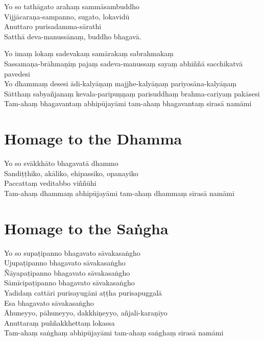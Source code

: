 \begin{leader}
\end{leader}

Yo so tathāgato arahaṃ sammāsambuddho\\
Vijjācaraṇa-sampanno, sugato, lokavidū\\
Anuttaro purisadamma-sārathi\\
Satthā deva-manussānaṃ, buddho bhagavā.

Yo imaṃ lokaṃ sadevakaṃ samārakaṃ sabrahmakaṃ\\
Sassamaṇa-brāhmaṇiṃ pajaṃ sadeva-manussaṃ sayaṃ abhiññā sacchikatvā pavedesi\\
Yo dhammaṃ desesi ādi-kalyāṇaṃ majjhe-kalyāṇaṃ pariyosāna-kalyāṇaṃ\\
Sātthaṃ sabyañjanaṃ kevala-paripuṇṇaṃ parisuddhaṃ brahma-cariyaṃ pakāsesi\\
Tam-ahaṃ bhagavantaṃ abhipūjayāmi tam-ahaṃ bhagavantaṃ sirasā namāmi

\section*{Homage to the Dhamma}

\begin{leader}
\end{leader}

Yo so svākkhāto bhagavatā dhammo\\
Sandiṭṭhiko, akāliko, ehipassiko, opanayiko\\
Paccattaṃ veditabbo viññūhi\\
Tam-ahaṃ dhammaṃ abhipūjayāmi tam-ahaṃ dhammaṃ sirasā namāmi

\section*{Homage to the Saṅgha}

\begin{leader}
\end{leader}

Yo so supaṭipanno bhagavato sāvakasaṅgho\\
Ujupaṭipanno bhagavato sāvakasaṅgho\\
Ñāyapaṭipanno bhagavato sāvakasaṅgho\\
Sāmīcipaṭipanno bhagavato sāvakasaṅgho\\
Yadidaṃ cattāri purisayugāni aṭṭha purisapuggalā\\
Esa bhagavato sāvakasaṅgho\\
Āhuneyyo, pāhuneyyo, dakkhiṇeyyo, añjali-karaṇīyo\\
Anuttaraṃ puññakkhettaṃ lokassa\\
Tam-ahaṃ saṅghaṃ abhipūjayāmi tam-ahaṃ saṅghaṃ sirasā namāmi

